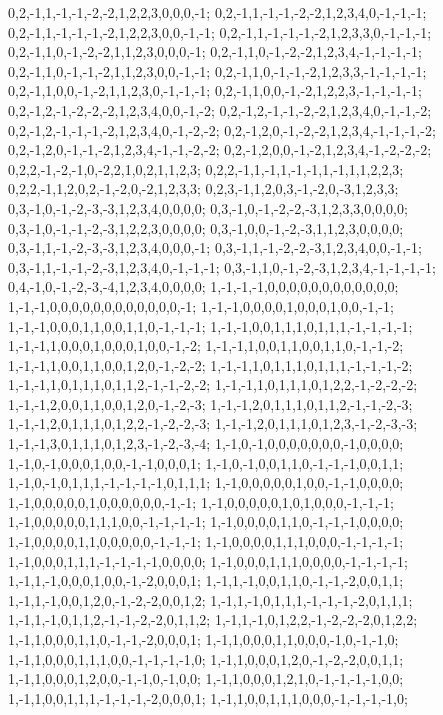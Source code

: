 {{0,2,-1,1,-1,-1,-2,-2,1,2,2,3,0,0,0,-1; 0,2,-1,1,-1,-1,-2,-2,1,2,3,4,0,-1,-1,-1; 0,2,-1,1,-1,-1,-1,-2,1,2,2,3,0,0,-1,-1; 0,2,-1,1,-1,-1,-1,-2,1,2,3,3,0,-1,-1,-1; 0,2,-1,1,0,-1,-2,-2,1,1,2,3,0,0,0,-1; 0,2,-1,1,0,-1,-2,-2,1,2,3,4,-1,-1,-1,-1; 0,2,-1,1,0,-1,-1,-2,1,1,2,3,0,0,-1,-1; 0,2,-1,1,0,-1,-1,-2,1,2,3,3,-1,-1,-1,-1; 0,2,-1,1,0,0,-1,-2,1,1,2,3,0,-1,-1,-1; 0,2,-1,1,0,0,-1,-2,1,2,2,3,-1,-1,-1,-1; 0,2,-1,2,-1,-2,-2,-2,1,2,3,4,0,0,-1,-2; 0,2,-1,2,-1,-1,-2,-2,1,2,3,4,0,-1,-1,-2;
0,2,-1,2,-1,-1,-1,-2,1,2,3,4,0,-1,-2,-2; 0,2,-1,2,0,-1,-2,-2,1,2,3,4,-1,-1,-1,-2; 0,2,-1,2,0,-1,-1,-2,1,2,3,4,-1,-1,-2,-2; 0,2,-1,2,0,0,-1,-2,1,2,3,4,-1,-2,-2,-2; 0,2,2,-1,-2,-1,0,-2,2,1,0,2,1,1,2,3; 0,2,2,-1,1,-1,1,-1,-1,1,-1,1,1,2,2,3; 0,2,2,-1,1,2,0,2,-1,-2,0,-2,1,2,3,3; 0,2,3,-1,1,2,0,3,-1,-2,0,-3,1,2,3,3; 0,3,-1,0,-1,-2,-3,-3,1,2,3,4,0,0,0,0; 0,3,-1,0,-1,-2,-2,-3,1,2,3,3,0,0,0,0; 0,3,-1,0,-1,-1,-2,-3,1,2,2,3,0,0,0,0; 0,3,-1,0,0,-1,-2,-3,1,1,2,3,0,0,0,0;
0,3,-1,1,-1,-2,-3,-3,1,2,3,4,0,0,0,-1; 0,3,-1,1,-1,-2,-2,-3,1,2,3,4,0,0,-1,-1; 0,3,-1,1,-1,-1,-2,-3,1,2,3,4,0,-1,-1,-1; 0,3,-1,1,0,-1,-2,-3,1,2,3,4,-1,-1,-1,-1; 0,4,-1,0,-1,-2,-3,-4,1,2,3,4,0,0,0,0; 1,-1,-1,-1,0,0,0,0,0,0,0,0,0,0,0,0; 1,-1,-1,0,0,0,0,0,0,0,0,0,0,0,0,-1; 1,-1,-1,0,0,0,0,1,0,0,0,1,0,0,-1,-1; 1,-1,-1,0,0,0,1,1,0,0,1,1,0,-1,-1,-1; 1,-1,-1,0,0,1,1,1,0,1,1,1,-1,-1,-1,-1; 1,-1,-1,1,0,0,0,1,0,0,0,1,0,0,-1,-2; 1,-1,-1,1,0,0,1,1,0,0,1,1,0,-1,-1,-2;
1,-1,-1,1,0,0,1,1,0,0,1,2,0,-1,-2,-2; 1,-1,-1,1,0,1,1,1,0,1,1,1,-1,-1,-1,-2; 1,-1,-1,1,0,1,1,1,0,1,1,2,-1,-1,-2,-2; 1,-1,-1,1,0,1,1,1,0,1,2,2,-1,-2,-2,-2; 1,-1,-1,2,0,0,1,1,0,0,1,2,0,-1,-2,-3; 1,-1,-1,2,0,1,1,1,0,1,1,2,-1,-1,-2,-3; 1,-1,-1,2,0,1,1,1,0,1,2,2,-1,-2,-2,-3; 1,-1,-1,2,0,1,1,1,0,1,2,3,-1,-2,-3,-3; 1,-1,-1,3,0,1,1,1,0,1,2,3,-1,-2,-3,-4; 1,-1,0,-1,0,0,0,0,0,0,0,-1,0,0,0,0; 1,-1,0,-1,0,0,0,1,0,0,-1,-1,0,0,0,1; 1,-1,0,-1,0,0,1,1,0,-1,-1,-1,0,0,1,1;
1,-1,0,-1,0,1,1,1,-1,-1,-1,-1,0,1,1,1; 1,-1,0,0,0,0,0,1,0,0,-1,-1,0,0,0,0; 1,-1,0,0,0,0,0,1,0,0,0,0,0,0,-1,-1; 1,-1,0,0,0,0,0,1,0,1,0,0,0,-1,-1,-1; 1,-1,0,0,0,0,0,1,1,1,0,0,-1,-1,-1,-1; 1,-1,0,0,0,0,1,1,0,-1,-1,-1,0,0,0,0; 1,-1,0,0,0,0,1,1,0,0,0,0,0,-1,-1,-1; 1,-1,0,0,0,0,1,1,1,0,0,0,-1,-1,-1,-1; 1,-1,0,0,0,1,1,1,-1,-1,-1,-1,0,0,0,0; 1,-1,0,0,0,1,1,1,0,0,0,0,-1,-1,-1,-1; 1,-1,1,-1,0,0,0,1,0,0,-1,-2,0,0,0,1; 1,-1,1,-1,0,0,1,1,0,-1,-1,-2,0,0,1,1;
1,-1,1,-1,0,0,1,2,0,-1,-2,-2,0,0,1,2; 1,-1,1,-1,0,1,1,1,-1,-1,-1,-2,0,1,1,1; 1,-1,1,-1,0,1,1,2,-1,-1,-2,-2,0,1,1,2; 1,-1,1,-1,0,1,2,2,-1,-2,-2,-2,0,1,2,2; 1,-1,1,0,0,0,1,1,0,-1,-1,-2,0,0,0,1; 1,-1,1,0,0,0,1,1,0,0,0,-1,0,-1,-1,0; 1,-1,1,0,0,0,1,1,1,0,0,-1,-1,-1,-1,0; 1,-1,1,0,0,0,1,2,0,-1,-2,-2,0,0,1,1; 1,-1,1,0,0,0,1,2,0,0,-1,-1,0,-1,0,0; 1,-1,1,0,0,0,1,2,1,0,-1,-1,-1,-1,0,0; 1,-1,1,0,0,1,1,1,-1,-1,-1,-2,0,0,0,1; 1,-1,1,0,0,1,1,1,0,0,0,-1,-1,-1,-1,0;
}}
